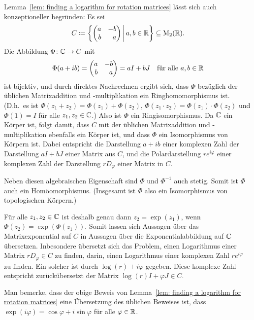 \documentclass[a4paper, 10pt, numbers=noenddot]{scrartcl}
\begin{document}
\begin{remark}
  Lemma~\ref{lem: finding a logarithm for rotation matrices} lässt sich auch konzeptioneller begründen:
  Es sei
  \[
    C \coloneqq
    \left\{
      \begin{pmatrix*}[r]
        a & -b  \\
        b &  a
      \end{pmatrix*}
    \,\middle|\,
      a, b \in \Rbb
    \right\}
    \subseteq
    \Mat_2(\Rbb).
  \]
  Die Abbildung $\Phi \colon \mathbb{C} \to C$ mit
  \[
    \Phi(a + i b)
    =
    \begin{pmatrix*}[r]
      a & -b  \\
      b &  a
    \end{pmatrix*}
    =
    a I + b J
    \quad
    \text{für alle $a, b \in \Rbb$}
  \]
  ist bijektiv, und durch direktes Nachrechnen ergibt sich, dass $\Phi$ bezüglich der üblichen Matrixaddition und -multiplikation ein Ringhomomorphismus ist. (D.h.\ es ist $\Phi(z_1 + z_2) = \Phi(z_1) + \Phi(z_2)$, $\Phi(z_1 \cdot z_2) = \Phi(z_1) \cdot \Phi(z_2)$ und $\Phi(1) = I$ für alle $z_1, z_2 \in \mathbb{C}$.)
  Also ist $\Phi$ ein Ringisomorphismus.
  Da $\mathbb{C}$ ein Körper ist, folgt damit, dass $C$ mit der üblichen Matrixaddition und -multiplikation ebenfalls ein Körper ist, und dass $\Phi$ ein Isomorphismus von Körpern ist.
  Dabei entspricht die Darstellung $a + ib$ einer komplexen Zahl der Darstellung $a I + b J$ einer Matrix aus $C$, und die Polardarstellung $r e^{i\varphi}$ einer komplexen Zahl der Darstellung $r D_\varphi$ einer Matrix in $C$.
  
  Neben diesen algebraischen Eigenschaft sind $\Phi$ und $\Phi^{-1}$ auch stetig.
  Somit ist $\Phi$ auch ein Homöomorphismus.
  (Insgesamt ist $\Phi$ also ein Isomorphismus von topologischen Körpern.)
  
  Für alle $z_1, z_2 \in \mathbb{C}$ ist deshalb genau dann $z_2 = \exp(z_1)$, wenn $\Phi(z_2) = \exp(\Phi(z_1))$.
  Somit lassen sich Aussagen über das Matrixexponential auf $C$ in Aussagen über die Exponentialabbildung auf $\mathbb{C}$ übersetzen.
  Inbesondere übersetzt sich das Problem, einen Logarithmus einer Matrix $r D_\varphi \in C$ zu finden, darin, einen Logarithmus einer komplexen Zahl $r e^{i \varphi}$ zu finden.
  Ein solcher ist durch $\log(r) + i \varphi$ gegeben.
  Diese komplexe Zahl entspricht zurückübersetzt der Matrix $\log(r) I + \varphi J \in C$.
  
  Man bemerke, dass der obige Beweis von Lemma~\ref{lem: finding a logarithm for rotation matrices} eine Übersetzung des üblichen Beweises ist, dass $\exp(i \varphi) = \cos\varphi + i \sin \varphi$ für alle $\varphi \in \mathbb{R}$.
\end{remark}
\end{document}
